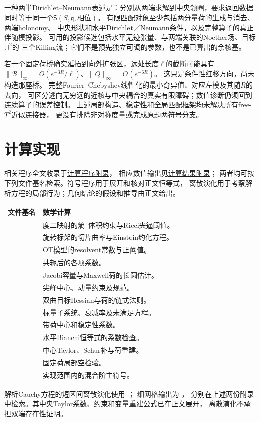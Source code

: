 \documentclass[UTF8,a4paper,11pt,fontset=fandol]{ctexart}
\numberwithin{equation}{section}
\theoremstyle{definition}
\begin{document}
一种两半Dirichlet--Neumann表述是：分别从两端求解到中央领圈，要求返回数据
同时等于同一个$\mathsf S(S,\mathfrak q,\text{相位})$。
有限匹配对象至少包括两分量荷的生成与消去、两端holonomy、
中央形状和水平Dirichlet／Neumann条件，以及完整算子的真正伴随模投影。
可用的投影候选包括水平无迹张量、与两端关联的Noether场、目标$\mathbb H^2$的
三个Killing流；它们不是预先独立可调的参数，也不是已算出的余核基。

若一个固定荷桥确实延拓到向外扩张区，远处长度$\ell$的截断可能具有
$\|\mathscr B\|_\infty=O(e^{-3R}/\ell)$、$\|Q\|_\infty=O(e^{-6R})$。
这只是条件性红移方向，尚未构造那座桥。
完整Fourier--Chebyshev线性化的最小奇异值、对应左模及其随$R$的去向，
可区分逃向无穷远的近核与中央耦合的真实有限障碍；数值诊断仍须回到连续算子的误差控制。
上述局部构造、稳定性和全局匹配框架均未解决所有free-$T^2$近似连接器，
更没有排除非对称度量或完成原题两符号分支。

\section{计算实现}
相关程序全文收录于\href{../references/computations.md}{计算程序附录}，
相应数值输出见\href{../references/experiments.md}{计算结果附录}；
两者均可按下列文件基名检索。符号程序用于展开和核对正文恒等式，
离散演化用于考察解析方程的局部行为；几何结论的假设和推导由正文给出。
\begin{longtable}{L{.57\textwidth}L{.31\textwidth}}
\toprule 文件基名 & 数学计算\\\midrule\endhead
{} & 度二映射的熵--体积约束与Ricci夹逼阈值。\\
 & 旋转标架的切片曲率与Einstein约化方程。\\
 & OT模型的resolvent常数与正阈值。\\
 & 共轭后的各项系数。\\
 & Jacobi容量与Maxwell荷的长圆估计。\\
 & 尖峰中心、动量约束及规范。\\
 & 双曲目标Hessian与荷的链式法则。\\
 & 标量子系统、衰减率及未满足方程。\\
 & 带荷中心和稳定性系数。\\
 & 水平Bianchi恒等式的系数检查。\\
 & 中心Taylor、Schur补与荷重建。\\
 & 固定荷局部空检验。\\
 & 实现范围内的混合阶主符号。\\\bottomrule
\end{longtable}
解析Cauchy方程的短区间离散演化使用
；
细网格输出为
，
分别在上述两份附录中检索。其中央Taylor系数、约束和变量重建公式已在正文展开，
离散演化不承担双端存在性证明。
\end{document}
